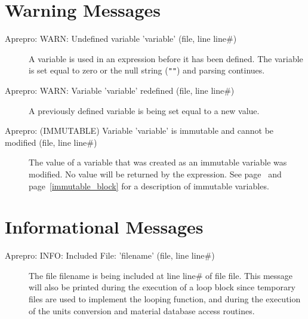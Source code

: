 \section{Warning Messages}

\begin{description}
\item[Aprepro:  WARN:  Undefined  variable  'variable'  (file,  line  line\#)]
A variable is used in an expression before it has been defined. The variable is
set equal to zero or the null string (\texttt{"}\texttt{"}) and parsing continues.

\item[Aprepro:  WARN:  Variable  'variable'  redefined  (file,  line  line\#)]
A previously defined variable is being set equal to a new value.

\item[Aprepro: (IMMUTABLE) Variable 'variable' is immutable and cannot be modified (file, line line\#)]
The value of a variable that was created as an immutable variable was
modified. No value will be returned by the expression. See page~\pageref{immutable} and
page~\ref{immutable_block} for a description of immutable variables.
\end{description}


\section{Informational Messages}

\begin{description}
\item[Aprepro: INFO: Included File: 'filename' (file, line line\#)] The file filename
is being included at line line\# of file file. This message will also be printed
during the execution of a loop block since temporary files are used to implement
the looping function, and during the execution of the units conversion and material
database access routines.
\end{description}
